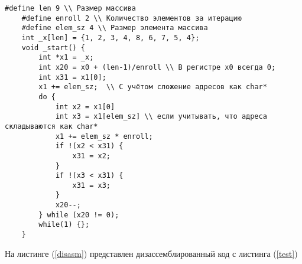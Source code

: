 \begin{lstlisting}[label=pseudo,caption={Псевдокод программы}]
	#define len 9 \\ Размер массива
	#define enroll 2 \\ Количество элементов за итерацию
	#define elem_sz 4 \\ Размер элемента массива
	int _x[len] = {1, 2, 3, 4, 8, 6, 7, 5, 4};
	void _start() {
		int *x1 = _x;
		int x20 = x0 + (len-1)/enroll \\ В регистре x0 всегда 0;
		int x31 = x1[0];
		x1 += elem_sz;  \\ С учётом сложение адресов как char*
		do {
			int x2 = x1[0]
			int x3 = x1[elem_sz] \\ если учитывать, что адреса складываются как char*
			x1 += elem_sz * enroll;
			if !(x2 < x31) {
				x31 = x2;
			}
			if !(x3 < x31) {
				x31 = x3;
			}
			x20--;
		} while (x20 != 0);
		while(1) {};
	}
\end{lstlisting}

На листинге (\ref{disasm}) представлен дизассемблированный код с листинга (\ref{test})


